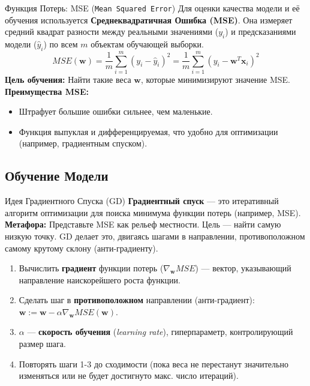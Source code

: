 \begin{myblock}{Функция Потерь: MSE (\texttt{Mean Squared Error})}
    Для оценки качества модели и её обучения используется \textbf{Среднеквадратичная Ошибка (MSE)}. Она измеряет средний квадрат разности между реальными значениями ($y_i$) и предсказаниями модели ($\hat{y}_i$) по всем $m$ объектам обучающей выборки.
    \[
    MSE(\mathbf{w}) = \frac{1}{m} \sum_{i=1}^{m} (y_i - \hat{y}_i)^2 = \frac{1}{m} \sum_{i=1}^{m} (y_i - \mathbf{w}^T \mathbf{x}_i)^2
    \]
    \textbf{Цель обучения:} Найти такие веса $\mathbf{w}$, которые минимизируют значение MSE.
    \textbf{Преимущества MSE:}
    \begin{itemize}[nosep, leftmargin=*]
        \item Штрафует большие ошибки сильнее, чем маленькие.
        \item Функция выпуклая и дифференцируемая, что удобно для оптимизации (например, градиентным спуском).
    \end{itemize}
\end{myblock}

\subsection{Обучение Модели}

\begin{textbox}{Идея Градиентного Спуска (GD)}
    \textbf{Градиентный спуск} — это итеративный алгоритм оптимизации для поиска минимума функции потерь (например, MSE).
    \textbf{Метафора:} Представьте MSE как рельеф местности. Цель — найти самую низкую точку. GD делает это, двигаясь шагами в направлении, противоположном самому крутому склону (анти-градиенту).
    \begin{enumerate}[nosep, leftmargin=*]
        \item Вычислить \textbf{градиент} функции потерь ($\nabla_{\mathbf{w}} MSE$) — вектор, указывающий направление наискорейшего роста функции.
        \item Сделать шаг в \textbf{противоположном} направлении (анти-градиент): $\mathbf{w} := \mathbf{w} - \alpha \nabla_{\mathbf{w}} MSE(\mathbf{w})$.
        \item $\alpha$ — \textbf{скорость обучения} (\textit{learning rate}), гиперпараметр, контролирующий размер шага.
        \item Повторять шаги 1-3 до сходимости (пока веса не перестанут значительно изменяться или не будет достигнуто макс. число итераций).
    \end{enumerate}
\end{textbox}

